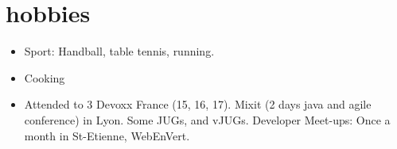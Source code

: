 \documentclass[]{k-cv} %
\begin{document}
\section{hobbies}
\vspace{-0.2cm}
\begin{freetext}
{
\begin{itemize}
  \item
  Sport: Handball, table tennis, running.
  \item
  Cooking
  \item
  Attended to 3 Devoxx France (15, 16, 17).
  Mixit (2 days java and agile conference) in Lyon. Some JUGs, and vJUGs.
  Developer Meet-ups: Once a month in St-Etienne, WebEnVert.
\end{itemize}
}
\end{freetext}
\end{document}
